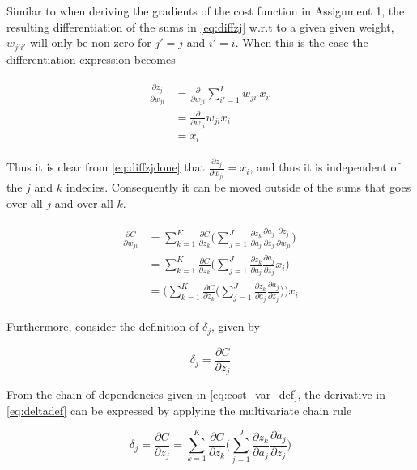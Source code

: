 \documentclass{article}
\begin{document}
Similar to when deriving the gradients of the cost function in Assignment 1, the resulting differentiation of the sums in \eqref{eq:diffzj} w.r.t to a given given weight, $w_{j'i'}$ will only be non-zero for $j' = j$ and $i' = i$. When this is the case the differentiation expression becomes

\begin{align}
\begin{split}
    \frac{\partial z_j}{\partial w_{ji}} &= \frac{\partial }{\partial w_{ji}} \sum_{i'=1}^I w_{ji'}x_{i'} \\
    &= \frac{\partial}{\partial w_{ji}} w_{ji}x_i \\
    &= x_i
\end{split}
\label{eq:diffzjdone}
\end{align}
 
 Thus it is clear from \eqref{eq:diffzjdone} that $\frac{\partial z_j}{\partial w_{ji}} = x_i$, and thus it is independent of the $j$ and $k$ indecies. Consequently it can be moved outside of the sums that goes over all $j$ and over all $k$.
 
\begin{align}
\begin{split}
    \frac{\partial C}{\partial w_{ji}} &= \sum_{k=1}^K \frac{\partial C}{\partial z_k}\Bigg( \sum_{j=1}^J \frac{\partial z_k}{\partial a_j}\frac{\partial a_j}{\partial z_j}\frac{\partial z_j}{\partial w_{ji}} \Bigg) \\
    &=  \sum_{k=1}^K \frac{\partial C}{\partial z_k}\Bigg( \sum_{j=1}^J \frac{\partial z_k}{\partial a_j}\frac{\partial a_j}{\partial z_j}x_i \Bigg) \\
    &=  \Bigg(\sum_{k=1}^K \frac{\partial C}{\partial z_k}\Bigg( \sum_{j=1}^J \frac{\partial z_k}{\partial a_j}\frac{\partial a_j}{\partial z_j}\Bigg)\Bigg) x_i
    \label{eq:movexiout}
\end{split}
\end{align}

Furthermore, consider the definition of $\delta_j$, given by

\begin{equation}
    \delta_j = \frac{\partial C}{\partial z_j}
    \label{eq:deltadef}
\end{equation}
 
 From the chain of dependencies given in \eqref{eq:cost_var_def}, the derivative in \eqref{eq:deltadef} can be expressed by applying the multivariate chain rule
 
\begin{equation}
    \delta_j = \frac{\partial C}{\partial z_j} = \sum_{k=1}^K \frac{\partial C}{\partial z_k} \bigg(\sum_{j=1}^J\frac{\partial z_k}{\partial a_j}\frac{\partial a_j}{\partial z_j} \bigg)
\end{equation}
 
\end{document}
